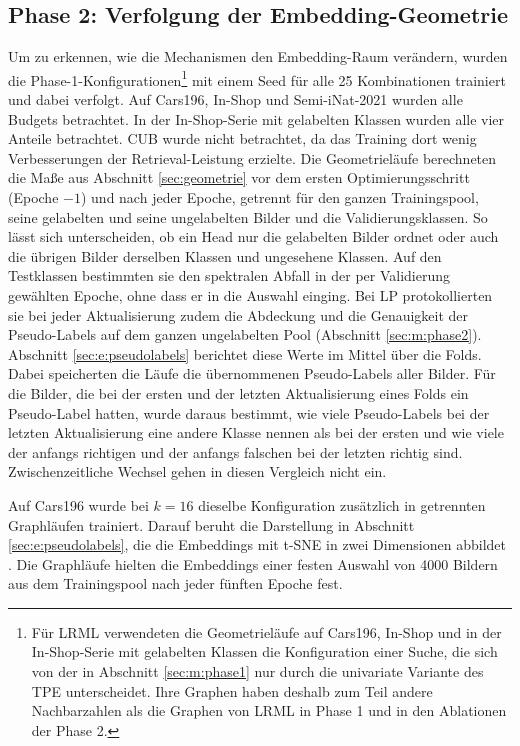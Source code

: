 \subsection{Phase 2: Verfolgung der Embedding-Geometrie}
\label{sec:m:geometrie}
Um zu erkennen, wie die Mechanismen den Embedding-Raum verändern, wurden die Phase-1-Konfigurationen\footnote{Für \ac{LRML} verwendeten die Geometrieläufe auf Cars196, In-Shop und in der In-Shop-Serie mit gelabelten Klassen die Konfiguration einer Suche, die sich von der in Abschnitt \ref{sec:m:phase1} nur durch die univariate Variante des \ac{TPE} unterscheidet. Ihre Graphen haben deshalb zum Teil andere Nachbarzahlen als die Graphen von \ac{LRML} in Phase 1 und in den Ablationen der Phase 2.} mit einem Seed für alle 25 Kombinationen trainiert und dabei verfolgt. Auf Cars196, In-Shop und Semi-iNat-2021 wurden alle Budgets betrachtet. In der In-Shop-Serie mit gelabelten Klassen wurden alle vier Anteile betrachtet. \ac{CUB} wurde nicht betrachtet, da das Training dort wenig Verbesserungen der Retrieval-Leistung erzielte. Die Geometrieläufe berechneten die Maße aus Abschnitt \ref{sec:geometrie} vor dem ersten Optimierungsschritt (Epoche $-1$) und nach jeder Epoche, getrennt für den ganzen Trainingspool, seine gelabelten und seine ungelabelten Bilder und die Validierungsklassen. So lässt sich unterscheiden, ob ein Head nur die gelabelten Bilder ordnet oder auch die übrigen Bilder derselben Klassen und ungesehene Klassen. Auf den Testklassen bestimmten sie den spektralen Abfall in der per Validierung gewählten Epoche, ohne dass er in die Auswahl einging. Bei \ac{LP} protokollierten sie bei jeder Aktualisierung zudem die Abdeckung und die Genauigkeit der Pseudo-Labels auf dem ganzen ungelabelten Pool (Abschnitt \ref{sec:m:phase2}). Abschnitt \ref{sec:e:pseudolabels} berichtet diese Werte im Mittel über die Folds. Dabei speicherten die Läufe die übernommenen Pseudo-Labels aller Bilder. Für die Bilder, die bei der ersten und der letzten Aktualisierung eines Folds ein Pseudo-Label hatten, wurde daraus bestimmt, wie viele Pseudo-Labels bei der letzten Aktualisierung eine andere Klasse nennen als bei der ersten und wie viele der anfangs richtigen und der anfangs falschen bei der letzten richtig sind. Zwischenzeitliche Wechsel gehen in diesen Vergleich nicht ein. 

Auf Cars196 wurde bei $k=16$ dieselbe Konfiguration zusätzlich in getrennten Graphläufen trainiert. Darauf beruht die Darstellung in Abschnitt \ref{sec:e:pseudolabels}, die die Embeddings mit \ac{t-SNE} in zwei Dimensionen abbildet \cite{van_der_maaten_visualizing_2008}. Die Graphläufe hielten die Embeddings einer festen Auswahl von 4000 Bildern aus dem Trainingspool nach jeder fünften Epoche fest.

